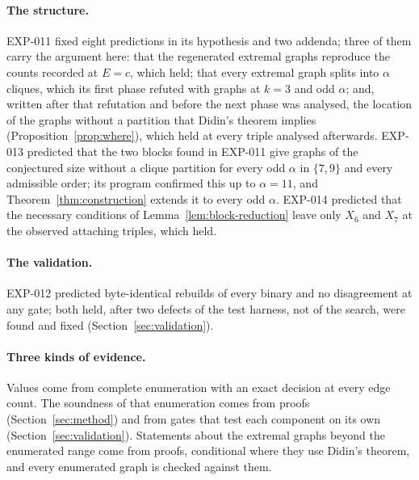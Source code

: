 \documentclass[11pt]{article}
\theoremstyle{definition}
\theoremstyle{remark}
\begin{document}
\paragraph{The structure.} EXP-011 fixed eight predictions in its hypothesis and two addenda; three of them carry
the argument here: that the regenerated extremal graphs reproduce the counts recorded at $E=c$, which held; that every extremal graph splits into $\alpha$
cliques, which its first phase refuted with graphs at $k=3$ and odd $\alpha$; and, written after that refutation and
before the next phase was analysed, the location of the graphs without a partition that Didin's theorem implies
(Proposition~\ref{prop:where}), which held at every triple analysed afterwards. EXP-013 predicted that the two blocks
found in EXP-011 give graphs of the conjectured size without a clique partition for every odd $\alpha$ in $\{7,9\}$
and every admissible order; its program confirmed this up to $\alpha=11$, and Theorem~\ref{thm:construction} extends
it to every odd $\alpha$. EXP-014 predicted that the necessary conditions of Lemma~\ref{lem:block-reduction} leave only
$X_6$ and $X_7$ at the observed attaching triples, which held.

\paragraph{The validation.} EXP-012 predicted byte-identical rebuilds of every binary and no disagreement at any gate;
both held, after two defects of the test harness, not of the search, were found and fixed
(Section~\ref{sec:validation}).

\paragraph{Three kinds of evidence.} Values come from complete enumeration with an exact decision at every edge count.
The soundness of that enumeration comes from proofs (Section~\ref{sec:method}) and from gates that test each component
on its own (Section~\ref{sec:validation}). Statements about the extremal graphs beyond the enumerated range come from
proofs, conditional where they use Didin's theorem, and every enumerated graph is checked against them.
\end{document}
